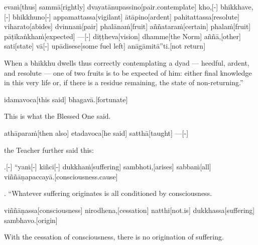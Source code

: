 \begin{samepage}
\begingl[glneveryline={\PaliGlossA,\PaliGlossB}]
evaṁ[thus] sammā[rightly] dvayatānupassino[pair.contemplate] kho,[-] bhikkhave,[-] bhikkhuno[-] appamattassa[vigilant] ātāpino[ardent] pahitattassa[resolute] viharato[abides] dvinnaṁ[pair] phalānaṁ[fruit] aññataraṁ[certain] phalaṁ[fruit] pāṭikaṅkhaṁ[expected] —[-] diṭṭheva[vision] dhamme[the Norm] aññā,[other] sati[state] vā[-] upādisese[some fuel left] anāgāmitā”ti.[not return]
\endgl
\nopagebreak
\linespread{0.5}
\begin{spacin}{0.2}
{\PaliGlossFT When a bhikkhu dwells thus correctly contemplating a dyad — heedful, ardent, and resolute — one of two fruits is to be expected of him: either final knowledge in this very life or, if there is a residue remaining, the state of non-returning.”}
\end{spacin}
\vskip 12pt
\end{samepage}
\begin{samepage}
\begingl[glneveryline={\PaliGlossA,\PaliGlossB}]
idamavoca[this said] bhagavā.[fortunate]
\endgl
\nopagebreak
\linespread{0.5}
\begin{spacin}{0.2}
{\PaliGlossFT This is what the Blessed One said.}
\end{spacin}
\vskip 12pt
\end{samepage}
\begin{samepage}
\begingl[glneveryline={\PaliGlossA,\PaliGlossB}]
athāparaṁ[then also] etadavoca[he said] satthā[taught] —[-]
\endgl
\nopagebreak
\linespread{0.5}
\begin{spacin}{0.2}
{\PaliGlossFT the Teacher further said this:}
\end{spacin}
\vskip 12pt
\end{samepage}
\vskip 0.2in
\begin{samepage}
.[-] “yaṁ[-] kiñci[-] dukkhaṁ[suffering] sambhoti,[arises] sabbaṁ[all] viññāṇapaccayā.[consciousness.cause]
\endgl
\nopagebreak
\linespread{0.5}
\begin{spacin}{0.2}
{. “Whatever suffering originates  is all conditioned by consciousness.}
\end{spacin}
\vskip 12pt
\end{samepage}
\begin{samepage}
\begingl[glneveryline={\PaliGlossA,\PaliGlossB}]
viññāṇassa[consciousness] nirodhena,[cessation] natthi[not.is] dukkhassa[suffering] sambhavo.[origin]
\endgl
\nopagebreak
\linespread{0.5}
\begin{spacin}{0.2}
{\PaliGlossFT With the cessation of consciousness, there is no origination of suffering.}
\end{spacin}
\vskip 12pt
\end{samepage}
